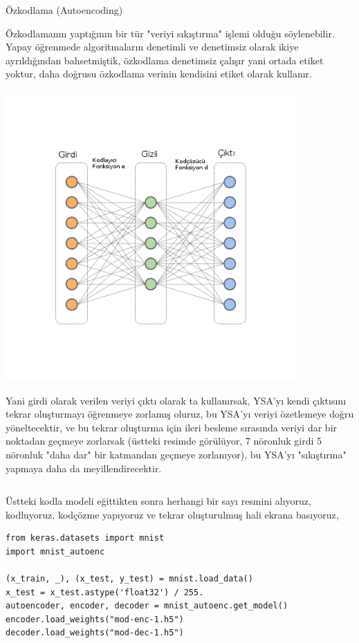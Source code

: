 \documentclass[12pt,fleqn]{article}\usepackage{../../common}
\begin{document}
Özkodlama (Autoencoding)

Özkodlamanın yaptığının bir tür "veriyi sıkıştırma" işlemi olduğu
söylenebilir. Yapay öğrenmede algoritmaların denetimli ve denetimsiz olarak
ikiye ayrıldığından bahsetmiştik, özkodlama denetimsiz çalışır yani ortada
etiket yoktur, daha doğrusu özkodlama verinin kendisini etiket olarak
kullanır.

\includegraphics[width=30em]{autoenc_02.png}

Yani girdi olarak verilen veriyi çıktı olarak ta kullanırsak, YSA'yı
kendi çıktısını tekrar oluşturmayı öğrenmeye zorlamış oluruz, bu
YSA'yı veriyi özetlemeye doğru yöneltecektir, ve bu tekrar oluşturma
için ileri besleme sırasında veriyi dar bir noktadan geçmeye zorlarsak
(üstteki resimde görülüyor, 7 nöronluk girdi 5 nöronluk "daha dar" bir
katmandan geçmeye zorlanıyor), bu YSA'yı "sıkıştırma" yapmaya daha da
meyillendirecektir.

\inputminted[fontsize=\footnotesize]{python}{mnist_autoenc.py}

Üstteki kodla modeli eğittikten sonra herhangi bir sayı resmini alıyoruz,
kodluyoruz, kodçözme yapıyoruz ve tekrar oluşturulmuş hali ekrana
basıyoruz,

\begin{verbatim}
from keras.datasets import mnist
import mnist_autoenc

(x_train, _), (x_test, y_test) = mnist.load_data()
x_test = x_test.astype('float32') / 255.
autoencoder, encoder, decoder = mnist_autoenc.get_model()
encoder.load_weights("mod-enc-1.h5")
decoder.load_weights("mod-dec-1.h5")
\end{verbatim}
\end{document}
